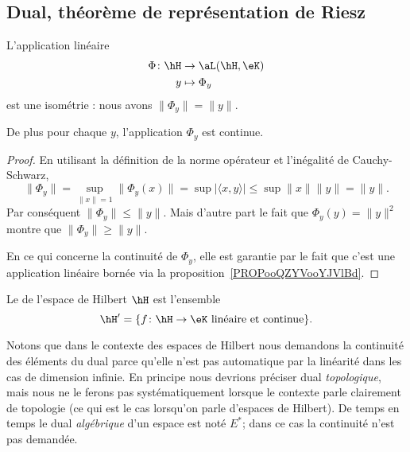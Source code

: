 \subsection{Dual, théorème de représentation de Riesz}

\begin{lemma}       \label{LemjYVcHE}
	L'application linéaire
	\begin{equation}
		\begin{aligned}
			\Phi\colon \hH & \to \aL(\hH,\eK) \\
			y              & \mapsto \Phi_y
		\end{aligned}
	\end{equation}
	est une isométrie : nous avons \( \| \Phi_y \|=\| y \|\).

	De plus pour chaque \( y\), l'application \( \Phi_y\) est continue.
\end{lemma}

\begin{proof}
	En utilisant la définition de la norme opérateur et l'inégalité de Cauchy-Schwarz,
	\begin{equation}
		\| \Phi_y \|=\sup_{\| x \| =1}\| \Phi_y(x) \|=\sup| \langle x, y\rangle  |\leq\sup\| x \|\| y \|=\| y \|.
	\end{equation}
	Par conséquent \( \| \Phi_y \|\leq\| y \|\). Mais d'autre part le fait que \( \Phi_y(y)=\| y \|^2\) montre que \( \| \Phi_y \|\geq \| y \|\).

	En ce qui concerne la continuité de \( \Phi_y\), elle est garantie par le fait que c'est une application linéaire bornée via la proposition~\ref{PROPooQZYVooYJVlBd}.
\end{proof}

\begin{definition}
	Le  de l'espace de Hilbert \( \hH\) est l'ensemble
	\begin{equation}
		\hH'=\{ f\colon \hH\to \eK\text{ linéaire et continue} \}.
	\end{equation}
\end{definition}
Notons que dans le contexte des espaces de Hilbert nous demandons la continuité des éléments du dual parce qu'elle n'est pas automatique par la linéarité dans les cas de dimension infinie. En principe nous devrions préciser dual \emph{topologique}, mais nous ne le ferons pas systématiquement lorsque le contexte parle clairement de topologie (ce qui est le cas lorsqu'on parle d'espaces de Hilbert). De temps en temps le dual \emph{algébrique} d'un espace est noté \( E^*\); dans ce cas la continuité n'est pas demandée.

